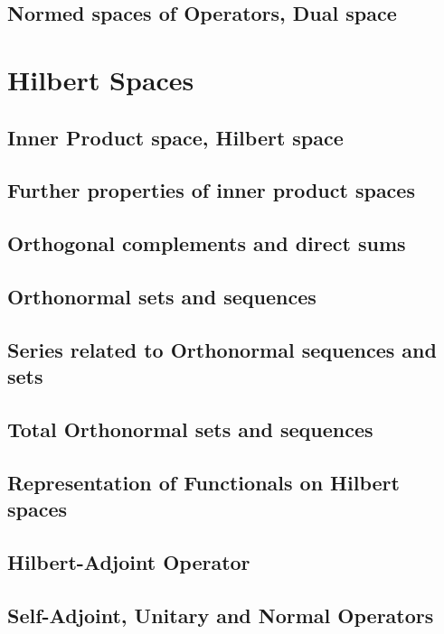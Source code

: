 \subsection{Normed spaces of Operators, Dual space}
\section{Hilbert Spaces}
\subsection{Inner Product space, Hilbert space}
\subsection{Further properties of inner product spaces}
\subsection{Orthogonal complements and direct sums}
\subsection{Orthonormal sets and sequences}
\subsection{Series related to Orthonormal sequences and sets}
\subsection{Total Orthonormal sets and sequences}
\setcounter{subsection}{7}
\subsection{Representation of Functionals on Hilbert spaces}
\subsection{Hilbert-Adjoint Operator}
\subsection{Self-Adjoint, Unitary and Normal Operators}


